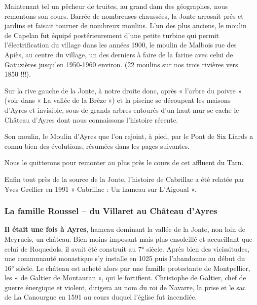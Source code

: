 \medskip

Maintenant tel un pêcheur de truites, au grand dam des géographes, nous remontons son cours.
Barrée de nombreuses chaussées, la Jonte arrosait prés et jardins et faisait tourner de
nombreux moulins. L’un des plus anciens, le moulin de Capelan fut équipé postérieurement
d’une petite turbine qui permit l’électrification du village dans les années 1900, le moulin de
Malbois rue des Apiès, au centre du village, un des derniers à faire de la farine avec celui de
Gatuzières jusqu’en 1950-1960 environ. (22 moulins sur nos trois rivières vers 1850 !!!).

\medskip

Sur la rive gauche de la Jonte, à notre droite donc, après « l’arbre du poivre » (voir dans « La vallée
de la Brèze ») et la piscine se découpent les maisons d’Ayres et invisible, sous de grands arbres
entourés d’un haut mur se cache le Château d’Ayres dont nous connaissons l’histoire récente.

\medskip

Son moulin, le Moulin d’Ayres que l’on rejoint, à pied, par le Pont de Six Liards a connu bien
des évolutions, résumées dans les pages suivantes.

\medskip

Nous le quitterons pour remonter au plus près le cours de cet affluent du Tarn.

\medskip

Enfin tout près de la source de la Jonte, l’histoire de Cabrillac a été relatée par Yves Grellier
en 1991 « Cabrillac : Un hameau sur L’Aigoual ».


\subsubsection{La famille Roussel -- du Villaret au Château d’Ayres}


\medskip

\textbf{Il était une fois à Ayres}, hameau dominant la vallée de la Jonte, non loin de Meyrueis, un
château. Bien moins imposant mais plus ensoleillé et accueillant que celui de Roquedols, il
avait été construit au 7° siècle. Après bien des vicissitudes, une communauté monastique s’y
installe en 1025 puis l’abandonne au début du 16° siècle. Le château est acheté alors par une
famille protestante de Montpellier, les « de Galtier de Montauran », qui le fortifient.
Christophe de Galtier, chef de guerre énergique et violent, dirigera au nom du roi de Navarre,
la prise et le sac de La Canourgue en 1591 au cours duquel l’église fut incendiée.

